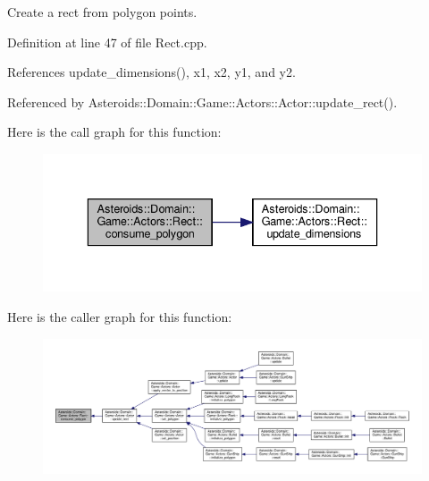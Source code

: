 Create a rect from polygon points. 



Definition at line 47 of file Rect.\+cpp.



References update\+\_\+dimensions(), x1, x2, y1, and y2.



Referenced by Asteroids\+::\+Domain\+::\+Game\+::\+Actors\+::\+Actor\+::update\+\_\+rect().

Here is the call graph for this function\+:\nopagebreak
\begin{figure}[H]
\begin{center}
\leavevmode
\includegraphics[width=336pt]{classAsteroids_1_1Domain_1_1Game_1_1Actors_1_1Rect_a687d0848c13d1b8dfbd2f896636b4145_cgraph}
\end{center}
\end{figure}
Here is the caller graph for this function\+:\nopagebreak
\begin{figure}[H]
\begin{center}
\leavevmode
\includegraphics[width=350pt]{classAsteroids_1_1Domain_1_1Game_1_1Actors_1_1Rect_a687d0848c13d1b8dfbd2f896636b4145_icgraph}
\end{center}
\end{figure}
\mbox{\label{classAsteroids_1_1Domain_1_1Game_1_1Actors_1_1Rect_a9e3bfefa639425d77c9f417061b4867e}} 
